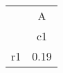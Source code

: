 \begin{tabular}{l*{1}{c}}
\hline\hline
            &           A\\
            &          c1\\
\hline
r1          &        0.19\\
\hline\hline
\end{tabular}
